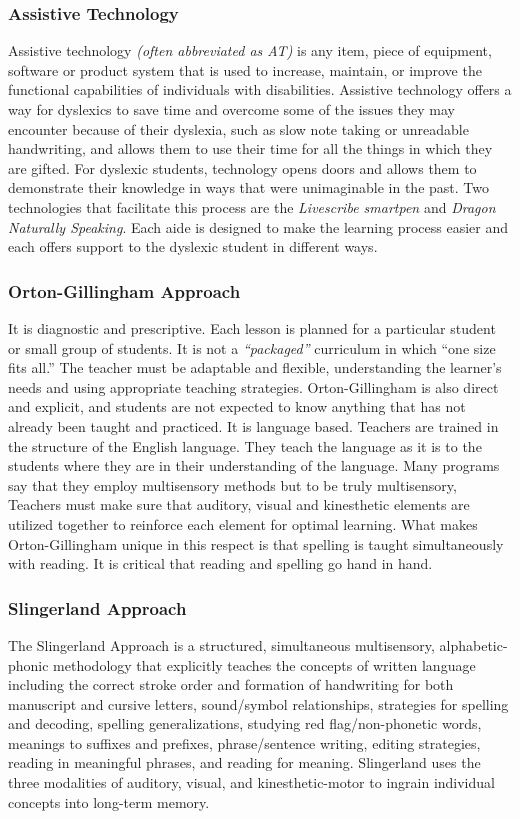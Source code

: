 \documentclass[letterpaper, 12pt, oneside]{book}
\begin{document}
\subsubsection{Assistive Technology}

Assistive technology \textit{(often abbreviated as AT)} is any item, piece of equipment, software or product system that is used to increase, maintain, or improve the functional capabilities of individuals with disabilities. Assistive technology offers a way for dyslexics to save time and overcome some of the issues they may encounter because of their dyslexia, such as slow note taking or unreadable handwriting, and allows them to use their time for all the things in which they are gifted. For dyslexic students, technology opens doors and allows them to demonstrate their knowledge in ways that were unimaginable in the past. Two technologies that facilitate this process are the \textit{Livescribe smartpen} and \textit{Dragon Naturally Speaking}. Each aide is designed to make the learning process easier and each offers support to the dyslexic student in different ways.

\subsubsection{Orton-Gillingham Approach}
It is diagnostic and prescriptive. Each lesson is planned for a particular student or small group of students. It is not a \textit{“packaged”} curriculum in which “one size fits all.” The teacher must be adaptable and flexible, understanding the learner’s needs and using appropriate teaching strategies. Orton-Gillingham is also direct and explicit, and students are not expected to know anything that has not already been taught and practiced. It is language based. Teachers are trained in the structure of the English language. They teach the language as it is to the students where they are in their understanding of the language. Many programs say that they employ multisensory methods but to be truly multisensory, Teachers must make sure that auditory, visual and kinesthetic elements are utilized together to reinforce each element for optimal learning. What makes Orton-Gillingham unique in this respect is that spelling is taught simultaneously with reading. It is critical that reading and spelling go hand in hand.

\subsubsection{Slingerland Approach}
The Slingerland Approach is a structured, simultaneous multisensory, alphabetic-phonic methodology that explicitly teaches the concepts of written language including the correct stroke order and formation of handwriting for both manuscript and cursive letters, sound/symbol relationships, strategies for spelling and decoding, spelling generalizations, studying red flag/non-phonetic words, meanings to suffixes and prefixes, phrase/sentence writing, editing strategies, reading in meaningful phrases, and reading for meaning. Slingerland uses the three modalities of auditory, visual, and kinesthetic-motor to ingrain individual concepts into long-term memory.
\end{document}
